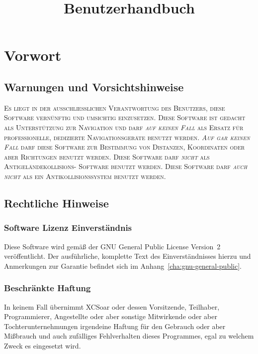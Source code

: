\documentclass[german,a4paper,11pt]{refrep}
\title{Benutzerhandbuch}%
\begin{document}
\sloppy%
%

\maketitle

 


\chapter*{Vorwort}

\section*{Warnungen und Vorsichtshinweise}

\warning
\textsc{Es liegt in der ausschließlichen Verantwortung des Benutzers, diese Software vernünftig
und umsichtig einzusetzen. Diese Software ist gedacht als Unterstützung zur Navigation
und darf \emph{auf keinen Fall} als Ersatz für professionelle, dedizierte Navigationsgeräte benutzt
werden. \emph{Auf gar keinen Fall} darf diese Software zur Bestimmung von Distanzen, Koordinaten
oder aber Richtungen benutzt werden. Diese Software darf \emph{nicht} als Antigeländekollisions- Software benutzt werden.
Diese Software darf \emph{auch nicht} als ein Antikollisionssystem benutzt werden.}


\section*{Rechtliche Hinweise}
\subsection*{Software Lizenz Einverständnis}

Diese Software wird gemäß der GNU General Public License Version~2 veröffentlicht. Der ausführliche,
komplette Text des Einverständnisses hierzu und Anmerkungen zur Garantie befindet sich
im Anhang~\ref{cha:gnu-general-public}.

\subsection*{Beschränkte Haftung}
In keinem Fall übernimmt XCSoar oder dessen Vorsitzende, Teilhaber, Programmierer, Angestellte  oder aber sonstige Mitwirkende  oder aber  Tochterunternehmungen irgendeine Haftung für den Gebrauch oder aber Mißbrauch und auch zufälliges Fehlverhalten dieses Programmes, egal zu welchem Zweck es eingesetzt wird.
\end{document}
